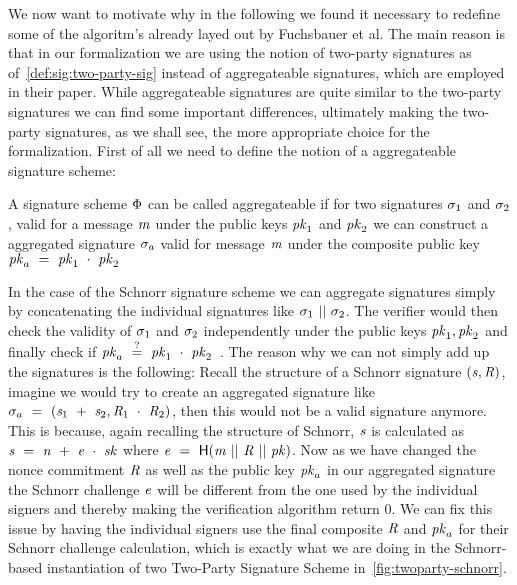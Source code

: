 We now want to motivate why in the following we found it necessary to redefine some of the algoritm's already layed out by Fuchsbauer et al.
The main reason is that in our formalization we are using the notion of two-party signatures as of~\cref{def:sig:two-party-sig} instead of aggregateable signatures, which are employed in their paper.
While aggregateable signatures are quite similar to the two-party signatures we can find some important differences, ultimately making the two-party signatures, as we shall see, the more appropriate choice for the formalization.
First of all we need to define the notion of a aggregateable signature scheme:
\begin{definition} \label{def:atom:aggsig}
    A signature scheme $\Phi$ can be called aggregateable if for two signatures $\sigma_1$ and $\sigma_2$, valid for a message $\mathit{m}$ under the public keys $\mathit{pk}_1$ and $\mathit{pk}_2$ we can construct a aggregated signature $\sigma_a$ valid for message $\mathit{m}$ under the composite public key $\mathit{pk}_a ~=~ \mathit{pk}_1 ~\cdot~ \mathit{pk}_2$
\end{definition}
In the case of the Schnorr signature scheme we can aggregate signatures simply by concatenating the individual signatures like $\sigma_1 ~||~ \sigma_2$.
The verifier would then check the validity of $\sigma_1$ and $\sigma_2$ independently under the public keys $\mathit{pk}_1, \mathit{pk}_2$ and finally check if $\mathit{pk}_a ~\stackrel{?}{=}~ \mathit{pk}_1 ~\cdot~ \mathit{pk}_2$~\cite{fuchsbauer2019aggregate}.
The reason why we can not simply add up the signatures is the following:
Recall the structure of a Schnorr signature $(\mathit{s}, \mathit{R})$, imagine we would try to create an aggregated signature like $\sigma_a ~=~ (\mathit{s}_1 ~+~ \mathit{s}_2, \mathit{R}_1 ~\cdot~ \mathit{R}_2)$, then this would not be a valid signature anymore.
This is because, again recalling the structure of Schnorr, $\mathit{s}$ is calculated as $\mathit{s} ~=~ \mathit{n} ~+~ \mathit{e} ~\cdot~ \mathit{sk}$ where $\mathit{e} ~=~ \mathsf{H} (\mathit{m} ~||~ \mathit{R} ~||~ \mathit{pk})$.
Now as we have changed the nonce commitment $\mathit{R}$ as well as the public key $\mathit{pk}_a$ in our aggregated signature the Schnorr challenge $\mathit{e}$ will be different from the one used by the individual signers and thereby making the verification algorithm return 0.
We can fix this issue by having the individual signers use the final composite $\mathit{R}$ and $\mathit{pk}_a$ for their Schnorr challenge calculation, which is exactly what we are doing in the Schnorr-based instantiation of two Two-Party Signature Scheme in~\cref{fig:twoparty-schnorr}.
